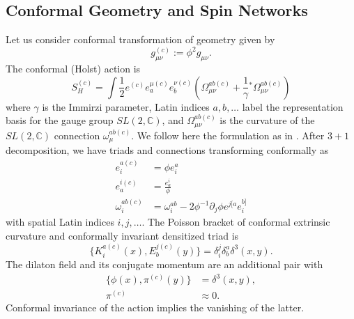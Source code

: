 \documentclass[11pt,a4paper]{article}
\theoremstyle{definition}
\begin{document}
	\subsection{Conformal Geometry and Spin Networks}
	
	Let us consider conformal transformation of geometry given by
	\begin{equation}
		g^{(c)}_{\mu \nu} := \phi^2 g_{\mu \nu} .
	\end{equation}
	The conformal (Holst) action is 
	\begin{equation}
		S_H^{(c)} = \int \frac{1}{2}e^{(c)} e_a^{\mu(c)}e_b^{\nu(c)}\left(\Omega_{\mu \nu}^{ab(c)} + \frac{1}{\gamma}{}^*\Omega_{\mu \nu}^{ab(c)}\right)
	\end{equation}
	where $\gamma$ is the Immirzi parameter,
	Latin indices $a,b,\ldots$ label the representation basis for the gauge group $SL(2,\mathbb{C})$, and $\Omega_{\mu \nu}^{ab(c)}$ is the curvature of the $SL(2,\mathbb{C})$ connection $\omega_\mu^{ab(c)}$.
	We follow here the formulation as in \cite{campiglia2016conformalLQG}.
	After $3+1$ decomposition, we have triads and connections transforming conformally as
	\begin{align}
		e_i^{a(c)} &= \phi e_i^a \\
		e^{i(c)}_a &= \frac{e^i_a}{\phi} \\
		\omega_i^{ab(c)} &= \omega_i^{ab} - 2\phi^{-1}\partial_j\phi e^{j[a} e^{b]}_i
	\end{align}
	with spatial Latin indices $i,j,\ldots$. The Poisson  bracket of conformal extrinsic curvature and conformally invariant densitized triad is
	\begin{equation}
		\{K_i^{a(c)}(x), E_b^{j(c)}(y)\} = \delta_i^j\delta^a_b\delta^3(x,y) .
	\end{equation}
	The dilaton field and its conjugate momentum are an additional pair with
	\begin{align}
		\{\phi(x), \pi^{(c)}(y)\} &= \delta^3(x,y) ,\\
		\pi^{(c)} &\approx 0 .
	\end{align}
	Conformal invariance of the action implies the vanishing of the latter.
	
\end{document}
